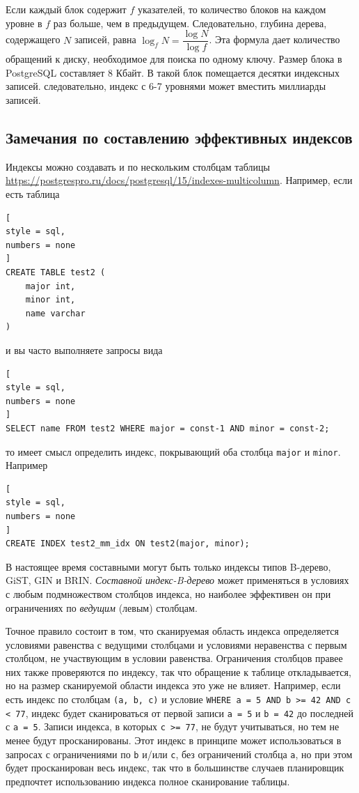 \documentclass[%
	11pt,
	a4paper,
	utf8,
		]{article}
\begin{document}
Если каждый блок содержит $ f $ указателей, то количество блоков на каждом уровне в $ f $ раз больше, чем в предыдущем. Следовательно, глубина дерева, содержащего $ N $ записей, равна $ \log_f N = \dfrac{\log N}{\log f} $. Эта формула дает количество обращений к диску, необходимое для поиска по одному ключу. Размер блока в PostgreSQL составляет 8 Кбайт. В такой блок помещается десятки индексных записей. следовательно, индекс с 6-7 уровнями может вместить миллиарды записей.

\subsection{Замечания по составлению эффективных индексов}

Индексы можно создавать и по нескольким столбцам таблицы \url{https://postgrespro.ru/docs/postgresql/15/indexes-multicolumn}. Например, если есть таблица
\begin{lstlisting}[
style = sql,
numbers = none
]
CREATE TABLE test2 (
    major int,
    minor int,
    name varchar
)
\end{lstlisting}
и вы часто выполняете запросы вида
\begin{lstlisting}[
style = sql,
numbers = none
]
SELECT name FROM test2 WHERE major = const-1 AND minor = const-2;
\end{lstlisting}
то имеет смысл определить индекс, покрывающий оба столбца \verb*|major| и \verb*|minor|. Например
\begin{lstlisting}[
style = sql,
numbers = none
]
CREATE INDEX test2_mm_idx ON test2(major, minor);
\end{lstlisting}

В настоящее время составными могут быть только индексы типов B-дерево, GiST, GIN и BRIN. \emph{Составной индекс-B-дерево} может применяться в условиях с любым подмножеством столбцов индекса, но {\color{blue}наиболее эффективен он при ограничениях по \emph{ведущим} (левым) столбцам.}

Точное правило состоит в том, что сканируемая область индекса определяется условиями равенства с ведущими столбцами и условиями неравенства с первым столбцом, не участвующим в условии равенства. Ограничения столбцов правее них также проверяются по индексу, так что обращение к таблице откладывается, но на размер сканируемой области индекса это уже не влияет. Например, если есть индекс по столбцам \verb|(a, b, c)| и условие \verb|WHERE a = 5 AND b >= 42 AND c < 77|, индекс будет сканироваться от первой записи \verb|a = 5| и \verb|b = 42| до последней с \verb|a = 5|. Записи индекса, в которых \verb|c >= 77|, не будут учитываться, но тем не менее будут просканированы. Этот индекс в принципе может использоваться в запросах с ограничениями по \verb*|b| и/или \verb*|c|, без ограничений столбца \verb|a|, но при этом будет просканирован весь индекс, так что в большинстве случаев планировщик предпочтет использованию индекса полное сканирование таблицы.
\end{document}
